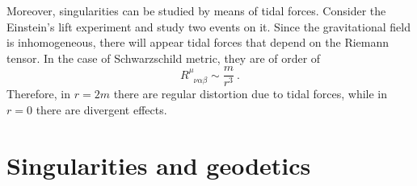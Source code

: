     Moreover, singularities can be studied by means of tidal forces. Consider the Einstein's lift experiment and study two events on it. Since the gravitational field is inhomogeneous, there will appear tidal forces that depend on the Riemann tensor. In the case of Schwarzschild metric, they are of order of 
    \begin{equation*}
        R^\mu_{\phantom \mu \nu \alpha \beta} \sim \frac{m}{r^3} ~.
    \end{equation*}
    Therefore, in $r = 2m$ there are regular distortion due to tidal forces, while in $r = 0$ there are divergent effects.

\section{Singularities and geodetics}

